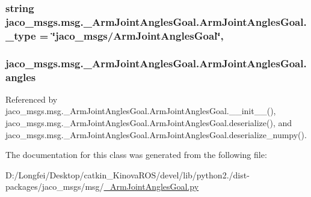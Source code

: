 \subsubsection[{\texorpdfstring{\+\_\+type}{_type}}]{\setlength{\rightskip}{0pt plus 5cm}string jaco\+\_\+msgs.\+msg.\+\_\+\+Arm\+Joint\+Angles\+Goal.\+Arm\+Joint\+Angles\+Goal.\+\_\+type = \char`\"{}jaco\+\_\+msgs/{\bf Arm\+Joint\+Angles\+Goal}\char`\"{}\hspace{0.3cm}{\ttfamily [static]}, {\ttfamily [private]}}\hypertarget{classjaco__msgs_1_1msg_1_1__ArmJointAnglesGoal_1_1ArmJointAnglesGoal_ae20948d5404deee4755fcebb6a6a6d21}{}\label{classjaco__msgs_1_1msg_1_1__ArmJointAnglesGoal_1_1ArmJointAnglesGoal_ae20948d5404deee4755fcebb6a6a6d21}
\subsubsection[{\texorpdfstring{angles}{angles}}]{\setlength{\rightskip}{0pt plus 5cm}jaco\+\_\+msgs.\+msg.\+\_\+\+Arm\+Joint\+Angles\+Goal.\+Arm\+Joint\+Angles\+Goal.\+angles}\hypertarget{classjaco__msgs_1_1msg_1_1__ArmJointAnglesGoal_1_1ArmJointAnglesGoal_a1627be30233ae9ff8861c8cc8fbd9566}{}\label{classjaco__msgs_1_1msg_1_1__ArmJointAnglesGoal_1_1ArmJointAnglesGoal_a1627be30233ae9ff8861c8cc8fbd9566}


Referenced by jaco\+\_\+msgs.\+msg.\+\_\+\+Arm\+Joint\+Angles\+Goal.\+Arm\+Joint\+Angles\+Goal.\+\_\+\+\_\+init\+\_\+\+\_\+(), jaco\+\_\+msgs.\+msg.\+\_\+\+Arm\+Joint\+Angles\+Goal.\+Arm\+Joint\+Angles\+Goal.\+deserialize(), and jaco\+\_\+msgs.\+msg.\+\_\+\+Arm\+Joint\+Angles\+Goal.\+Arm\+Joint\+Angles\+Goal.\+deserialize\+\_\+numpy().



The documentation for this class was generated from the following file\+:\begin{DoxyCompactItemize}
\item 
D\+:/\+Longfei/\+Desktop/catkin\+\_\+\+Kinova\+R\+O\+S/devel/lib/python2./dist-\/packages/jaco\+\_\+msgs/msg/\hyperlink{__ArmJointAnglesGoal_8py}{\+\_\+\+Arm\+Joint\+Angles\+Goal.\+py}\end{DoxyCompactItemize}
